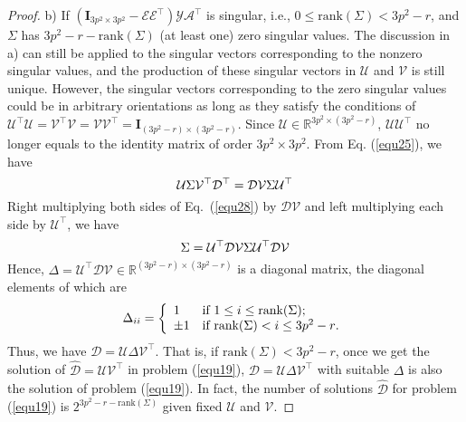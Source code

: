 \begin{proof}
b) If $(\bm{I}_{3p^2\times 3p^2}-\mathcal{E}\mathcal{E}^{\top})\mathcal{Y}\mathcal{A}^{\top}$ is singular, i.e.,  $0\le \text{rank}(\Sigma)< 3p^2-r$, and $\Sigma$ has $3p^2-r-\text{rank}(\Sigma)$ (at least one) zero singular values. The discussion in a) can still be applied to the singular vectors corresponding to the nonzero singular values, and the production of these singular vectors in $\mathcal{U}$ and $\mathcal{V}$ is still unique. However, the singular vectors corresponding to the zero singular values could be in arbitrary orientations as long as they satisfy the conditions of $\mathcal{U}^{\top}\mathcal{U}=\mathcal{V}^{\top}\mathcal{V}=\mathcal{V}\mathcal{V}^{\top}=\bm{I}_{(3p^2-r)\times (3p^2-r)}$. Since $\mathcal{U}\in \mathbb{R}^{3p^2\times (3p^2-r)}$, $\mathcal{U}\mathcal{U}^{\top}$ no longer equals to the identity matrix of order $3p^2\times 3p^2$. From Eq. (\ref{equ25}), we have
\begin{equation}\label{equ28}
\mathcal{U}\Sigma\mathcal{V}^{\top}\mathcal{D}^{\top}
=
\mathcal{D}\mathcal{V}\Sigma\mathcal{U}^{\top}
\vspace{-2mm}
\end{equation}
Right multiplying both sides of Eq.\ (\ref{equ28}) by $\mathcal{D}\mathcal{V}$ and left multiplying each side by $\mathcal{U}^{\top}$, we have
\vspace{-2mm}
\begin{equation}\label{equ29}
\Sigma
=
\mathcal{U}^{\top}\mathcal{D}\mathcal{V}\Sigma\mathcal{U}^{\top}\mathcal{D}\mathcal{V}
\vspace{-2mm}
\end{equation}
Hence, $\Delta=\mathcal{U}^{\top}\mathcal{D}\mathcal{V}\in\mathbb{R}^{(3p^2-r)\times (3p^2-r)}$ is a diagonal matrix, the diagonal elements of which are 
\vspace{-1mm}
\begin{displaymath}
\Delta_{ii}= \left\{ \begin{array}{ll}
1 & \textrm{if $1\le i\le \text{rank}(\Sigma)$};\\
\pm 1 & \textrm{if $\text{rank}(\Sigma)< i \le 3p^2-r$}.\\
\end{array} \right.
\vspace{-1mm}
\end{displaymath}
Thus, we have $\mathcal{D}=\mathcal{U}\Delta\mathcal{V}^{\top}$. That is, if $\text{rank}(\Sigma)<3p^2-r$, once we get the solution of $\hat{\mathcal{D}}=\mathcal{U}\mathcal{V}^{\top}$ in problem (\ref{equ19}), $\mathcal{D}=\mathcal{U}\Delta\mathcal{V}^{\top}$ with suitable $\Delta$ is also the solution of problem (\ref{equ19}). In fact, the number of solutions $\hat{\mathcal{D}}$ for problem (\ref{equ19}) is $2^{3p^2-r-\text{rank}(\Sigma)}$ given fixed $\mathcal{U}$ and $\mathcal{V}$.
\end{proof}



